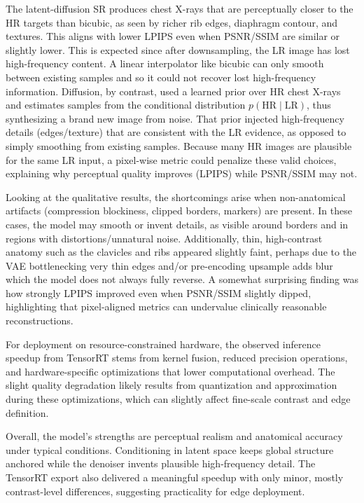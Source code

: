 \documentclass{article} %
\begin{document}
The latent-diffusion SR produces chest X-rays that are perceptually closer to the HR targets than bicubic, as seen by richer rib edges, diaphragm contour, and textures. This aligns with lower LPIPS even when PSNR/SSIM are similar or slightly lower. This is expected since after downsampling, the LR image has lost high-frequency content. A linear interpolator like bicubic can only smooth between existing samples and so it could not recover lost high-frequency information. Diffusion, by contrast, used a learned prior over HR chest X-rays and estimates samples from the conditional distribution $p(\mathrm{HR} \mid \mathrm{LR})$, thus synthesizing a brand new image from noise. That prior injected high-frequency details (edges/texture) that are consistent with the LR evidence, as opposed to simply smoothing from existing samples. Because many HR images are plausible for the same LR input, a pixel-wise metric could penalize these valid choices, explaining why perceptual quality improves (LPIPS) while PSNR/SSIM may not.

Looking at the qualitative results, the shortcomings arise when non-anatomical artifacts (compression blockiness, clipped borders, markers) are present. In these cases, the model may smooth or invent details, as visible around borders and in regions with distortions/unnatural noise. Additionally, thin, high-contrast anatomy such as the clavicles and ribs appeared slightly faint, perhaps due to the VAE bottlenecking very thin edges and/or pre-encoding upsample adds blur which the model does not always fully reverse. A somewhat surprising finding was how strongly LPIPS improved even when PSNR/SSIM slightly dipped, highlighting that pixel-aligned metrics can undervalue clinically reasonable reconstructions.

For deployment on resource-constrained hardware, the observed inference speedup from TensorRT stems from kernel fusion, reduced precision operations, and hardware-specific optimizations that lower computational overhead. The slight quality degradation likely results from quantization and approximation during these optimizations, which can slightly affect fine-scale contrast and edge definition.

Overall, the model's strengths are perceptual realism and anatomical accuracy under typical conditions. Conditioning in latent space keeps global structure anchored while the denoiser invents plausible high-frequency detail. The TensorRT export also delivered a meaningful speedup with only minor, mostly contrast-level differences, suggesting practicality for edge deployment.
\end{document}
